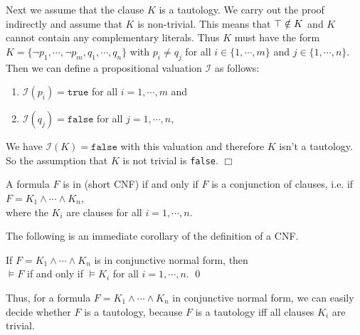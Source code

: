 Next we assume that the clause $K$ is a tautology.  We carry out the proof
indirectly and assume that $K$ is non-trivial.  This means that $\top \notin K$ and
$K$ cannot contain any complementary literals.  Thus $K$ must have the form
\\[0.2cm]
\hspace*{1.3cm} 
$K = \{ \neg p_1, \cdots, \neg p_m, q_1, \cdots, q_n \}$ \quad with $p_i
\not= q_j$ for all $i \in \{ 1,\cdots,m\}$ and $j \in \{1, \cdots, n\}$.
\\[0.2cm]
Then we can define a propositional valuation $\mathcal{I}$ as follows:
\begin{enumerate}
\item $\mathcal{I}(p_i) = \texttt{true}$ for all $i = 1, \cdots, m$ and
\item $\mathcal{I}(q_j) = \texttt{false}$ for all $j = 1, \cdots, n$,
\end{enumerate}
We have $\mathcal{I}(K) = \texttt{false}$ with this valuation and therefore $K$ isn't a tautology.  So the
assumption that $K$ is not trivial is \texttt{false}. 
\hspace*{\fill}  $\Box$

\begin{Definition}  
  A formula $F$ is in  (short CNF)
  if and only if $F$ is a conjunction of clauses, i.e. if \\[0.2cm]
  \hspace*{1.3cm} $F = K_1 \wedge \cdots \wedge K_n$, \\[0.2cm]
  where the $K_i$ are clauses for all $i=1,\cdots,n$. \eox
\end{Definition}

\noindent
The following is an immediate corollary of the definition of a CNF.
\begin{Corollary} \label{corollary:knf}
  If $F = K_1 \wedge \cdots \wedge K_n$ is in conjunctive normal form, then\\[0.2cm]
  \hspace*{1.3cm} $\models F$ \quad if and only if \quad $\models K_i$ \quad for all $i=1,\cdots,n$. \qed
\end{Corollary}

Thus, for a formula $F = K_1 \wedge \cdots \wedge K_n$ in conjunctive normal form, we can easily decide whether
$F$ is a tautology, because $F$ is a tautology iff all clauses $K_i$ are trivial.
\vspace*{0.2cm}

